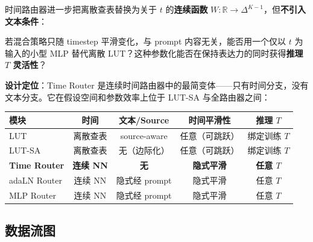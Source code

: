 \documentclass[11pt,a4paper]{article}
\newcommand{\R}{\mathbb{R}}
\begin{document}
时间路由器进一步把离散查表替换为关于 $t$ 的\textbf{连续函数} $W: \R \to \Delta^{K-1}$，但\textbf{不引入文本条件}：

\begin{tcolorbox}[colback=blue!5, colframe=blue!50, title=核心问题]
若混合策略只随 timestep 平滑变化，与 prompt 内容无关，能否用一个仅以 $t$ 为输入的小型 MLP 替代离散 LUT？这种参数化能否在保持表达力的同时获得\textbf{推理 $T$ 灵活性}？
\end{tcolorbox}

\textbf{设计定位}：Time Router 是连续时间路由器中的最简变体——只有时间分支，没有文本分支。它在假设空间和参数效率上位于 LUT-SA 与全路由器之间：

\begin{center}
\small
\begin{tabular}{l|cccc}
\toprule
\textbf{模块} & \textbf{时间} & \textbf{文本/Source} & \textbf{时间平滑性} & \textbf{推理 $T$} \\
\midrule
LUT          & 离散查表 & source-aware       & 任意（可跳跃）  & 绑定训练 $T$ \\
LUT-SA       & 离散查表 & 无（边际化）       & 任意（可跳跃）  & 绑定训练 $T$ \\
\textbf{Time Router} & \textbf{连续 NN} & \textbf{无} & \textbf{隐式平滑} & \textbf{任意 $T$} \\
adaLN Router & 连续 NN  & 隐式经 prompt      & 隐式平滑        & 任意 $T$ \\
MLP Router   & 连续 NN  & 隐式经 prompt      & 隐式平滑        & 任意 $T$ \\
\bottomrule
\end{tabular}
\end{center}

\subsection{数据流图}
\end{document}
